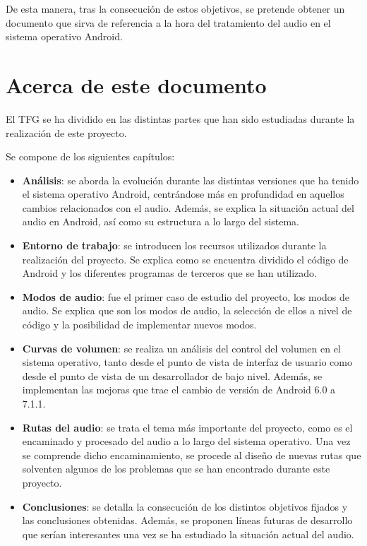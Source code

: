 De esta manera, tras la consecución de estos objetivos, se pretende obtener un documento que sirva de referencia a la hora del tratamiento del audio en el sistema operativo Android.

\section{Acerca de este documento}
El \gls{TFG} se ha dividido en las distintas partes que han sido estudiadas durante la realización de este proyecto.

Se compone de los siguientes capítulos:
\begin{itemize}
	\item{\textbf{Análisis}: se aborda la evolución durante las distintas versiones que ha tenido el sistema operativo Android, centrándose más en profundidad en aquellos cambios relacionados con el audio. Además, se explica la situación actual del audio en Android, así como su estructura a lo largo del sistema.}
	\item{\textbf{Entorno de trabajo}: se introducen los recursos utilizados durante la realización del proyecto. Se explica como se encuentra dividido el código de Android y los diferentes programas de terceros que se han utilizado.}
	\item{\textbf{Modos de audio}: fue el primer caso de estudio del proyecto, los modos de audio. Se explica que son los modos de audio, la selección de ellos a nivel de código y la posibilidad de implementar nuevos modos.}
	\item{\textbf{Curvas de volumen}: se realiza un análisis del control del volumen en el sistema operativo, tanto desde el punto de vista de interfaz de usuario como desde el punto de vista de un desarrollador de bajo nivel. Además, se implementan las mejoras que trae el cambio de versión de Android 6.0 a 7.1.1.}
	\item{\textbf{Rutas del audio}: se trata el tema más importante del proyecto, como es el encaminado y procesado del audio a lo largo del sistema operativo. Una vez se comprende dicho encaminamiento, se procede al diseño de nuevas rutas que solventen algunos de los problemas que se han encontrado durante este proyecto.}
	\item{\textbf{Conclusiones}: se detalla la consecución de los distintos objetivos fijados y las conclusiones obtenidas. Además, se proponen líneas futuras de desarrollo que serían interesantes una vez se ha estudiado la situación actual del audio.}
\end{itemize}